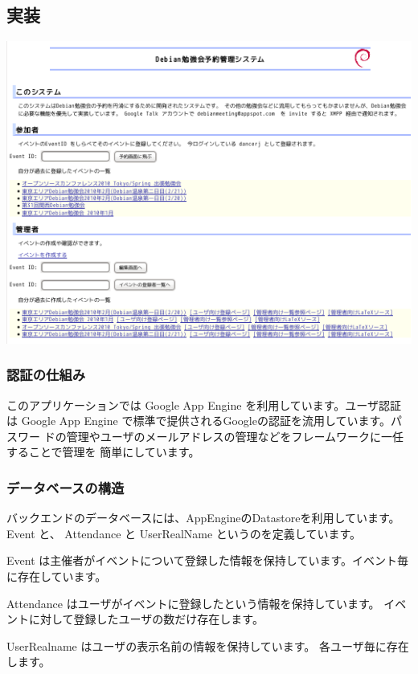 \documentclass[mingoth,a4paper]{jsarticle}
\begin{document}
\subsection{実装}

\includegraphics[width=0.5\hsize]{image201002/debianmeeting-screenshot.png}

\subsubsection{認証の仕組み}

このアプリケーションでは Google App Engine を利用しています。ユーザ認証は
Google App Engine で標準で提供されるGoogleの認証を流用しています。パスワー
ドの管理やユーザのメールアドレスの管理などをフレームワークに一任することで管理を
簡単にしています。


\subsubsection{データベースの構造}

バックエンドのデータベースには、AppEngineのDatastoreを利用しています。
Event と、 Attendance と UserRealName というのを定義しています。

Event は主催者がイベントについて登録した情報を保持しています。イベント毎
に存在しています。

Attendance はユーザがイベントに登録したという情報を保持しています。
イベントに対して登録したユーザの数だけ存在します。

UserRealname はユーザの表示名前の情報を保持しています。
各ユーザ毎に存在します。
\end{document}
